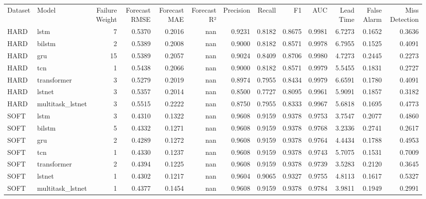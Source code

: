 \begin{tabular}{llrrrrrrrrrrr}
Dataset & Model & Failure Weight & Forecast RMSE & Forecast MAE & Forecast R² & Precision & Recall & F1 & AUC & Lead Time & False Alarm & Miss Detection \\
HARD & lstm & 7 & 0.5370 & 0.2016 & nan & 0.9231 & 0.8182 & 0.8675 & 0.9981 & 6.7273 & 0.1652 & 0.3636 \\
HARD & bilstm & 2 & 0.5389 & 0.2008 & nan & 0.9000 & 0.8182 & 0.8571 & 0.9978 & 6.7955 & 0.1525 & 0.4091 \\
HARD & gru & 15 & 0.5389 & 0.2057 & nan & 0.9024 & 0.8409 & 0.8706 & 0.9980 & 4.7273 & 0.2445 & 0.2273 \\
HARD & tcn & 1 & 0.5438 & 0.2066 & nan & 0.9000 & 0.8182 & 0.8571 & 0.9979 & 5.5455 & 0.1831 & 0.2727 \\
HARD & transformer & 3 & 0.5279 & 0.2019 & nan & 0.8974 & 0.7955 & 0.8434 & 0.9979 & 6.6591 & 0.1780 & 0.4091 \\
HARD & lstnet & 3 & 0.5357 & 0.2014 & nan & 0.8500 & 0.7727 & 0.8095 & 0.9961 & 5.9091 & 0.1857 & 0.3182 \\
HARD & multitask_lstnet & 3 & 0.5515 & 0.2222 & nan & 0.8750 & 0.7955 & 0.8333 & 0.9967 & 5.6818 & 0.1695 & 0.4773 \\
SOFT & lstm & 3 & 0.4310 & 0.1322 & nan & 0.9608 & 0.9159 & 0.9378 & 0.9753 & 3.7547 & 0.2077 & 0.4860 \\
SOFT & bilstm & 5 & 0.4332 & 0.1271 & nan & 0.9608 & 0.9159 & 0.9378 & 0.9768 & 3.2336 & 0.2741 & 0.2617 \\
SOFT & gru & 2 & 0.4289 & 0.1272 & nan & 0.9608 & 0.9159 & 0.9378 & 0.9764 & 4.4434 & 0.1788 & 0.4953 \\
SOFT & tcn & 1 & 0.4330 & 0.1237 & nan & 0.9608 & 0.9159 & 0.9378 & 0.9743 & 5.7075 & 0.1531 & 0.7009 \\
SOFT & transformer & 2 & 0.4394 & 0.1225 & nan & 0.9608 & 0.9159 & 0.9378 & 0.9739 & 3.5283 & 0.2120 & 0.3645 \\
SOFT & lstnet & 1 & 0.4302 & 0.1217 & nan & 0.9604 & 0.9065 & 0.9327 & 0.9755 & 4.8113 & 0.1617 & 0.5327 \\
SOFT & multitask_lstnet & 1 & 0.4377 & 0.1454 & nan & 0.9608 & 0.9159 & 0.9378 & 0.9784 & 3.9811 & 0.1949 & 0.2991 \\
\end{tabular}
